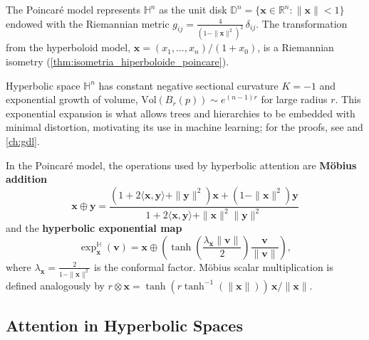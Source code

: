 \begin{definition}\label{def:modelo_poincare}
The Poincaré model represents $\mathbb{H}^n$ as the unit disk $\mathbb{D}^n = \{\mathbf{x} \in \mathbb{R}^n : \|\mathbf{x}\| < 1\}$ endowed with the Riemannian metric $g_{ij} = \frac{4}{(1-\|\mathbf{x}\|^2)^2}\, \delta_{ij}$. The transformation from the hyperboloid model, $\mathbf{x} = (x_1, \ldots, x_n)/(1 + x_0)$, is a Riemannian isometry (\autoref{thm:isometria_hiperboloide_poincare}).
\end{definition}

\begin{theorem}\label{thm:propiedades_espacio_hiperbolico}
Hyperbolic space $\mathbb{H}^n$ has constant negative sectional curvature $K = -1$ and exponential growth of volume, $\text{Vol}(B_r(p)) \sim e^{(n-1)r}$ for large radius $r$. This exponential expansion is what allows trees and hierarchies to be embedded with minimal distortion, motivating its use in machine learning; for the proofs, see \citep{do1976differential} and \autoref{ch:gdl}.
\end{theorem}

\begin{definition}\label{def:operaciones_hiperbolicas}
In the Poincaré model, the operations used by hyperbolic attention are \textbf{Möbius addition}
\begin{equation}
\mathbf{x} \oplus \mathbf{y} = \frac{(1+2\langle\mathbf{x},\mathbf{y}\rangle+\|\mathbf{y}\|^2)\mathbf{x} + (1-\|\mathbf{x}\|^2)\mathbf{y}}{1+2\langle\mathbf{x},\mathbf{y}\rangle+\|\mathbf{x}\|^2\|\mathbf{y}\|^2}
\end{equation}
and the \textbf{hyperbolic exponential map}
\begin{equation}
\exp_{\mathbf{x}}^{\mathbb{H}}(\mathbf{v}) = \mathbf{x} \oplus \left(\tanh\left(\frac{\lambda_{\mathbf{x}} \|\mathbf{v}\|}{2}\right) \frac{\mathbf{v}}{\|\mathbf{v}\|}\right),
\end{equation}
where $\lambda_{\mathbf{x}} = \frac{2}{1-\|\mathbf{x}\|^2}$ is the conformal factor. Möbius scalar multiplication is defined analogously by $r \otimes \mathbf{x} = \tanh(r \tanh^{-1}(\|\mathbf{x}\|))\, \mathbf{x}/\|\mathbf{x}\|$.
\end{definition}

\subsection{Attention in Hyperbolic Spaces}


